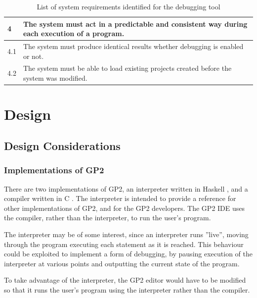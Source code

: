 \documentclass[authoryearcitations]{UoYCSproject}
\begin{document}
\begin{table}[tbp]
\begin{tabularx}{\linewidth}{|l|X|}
        4    &  The system must act in a predictable and consistent way during
                each execution of a program. \\ \hline
        4.1  &  The system must produce identical results whether debugging is
                enabled or not. \\ \hline
        4.2  &  The system must be able to load existing projects created before
                the system was modified. \\ \hline
    \end{tabularx}
    \caption{List of system requirements identified for the debugging tool}
    \label{tab:SystemRequirements}
\end{table}

\clearpage


\chapter{Design}
\label{cha:Design}

\section{Design Considerations}

\subsection{Implementations of GP2}
\label{sec:ImplementationsOfGP2}

There are two implementations of GP2, an interpreter written in Haskell
\citep{bak2015,GP2Interpreter}, and a compiler written in C
\citep{bak2015,GP2Compiler}. The interpreter is intended to provide a
reference for other implementations of GP2, and for the GP2 developers. The
GP2 IDE uses the compiler, rather than the interpreter, to run the user's program.

The interpreter may be of some interest, since an interpreter runs ''live'',
moving through the program executing each statement as it is reached. This
behaviour could be exploited to implement a form of debugging, by pausing
execution of the interpreter at various points and outputting the current state
of the program.

To take advantage of the interpreter, the GP2 editor would have to be modified
so that it runs the user's program using the interpreter rather than the compiler.
\end{document}
